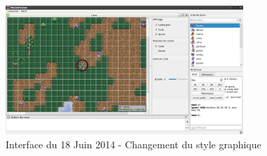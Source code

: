 \begin{figure}[h!]
	\centering
	\includegraphics[width=0.8\textwidth]{img/gui_history/2014_06_18_screen.png}
	\caption{Interface du 18 Juin 2014 - Changement du style graphique}
\end{figure}
